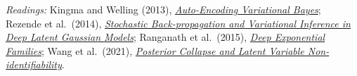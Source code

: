 \documentclass[12pt]{article}
\begin{document}
\vspace{0.05in}
{\footnotesize
\textit{Readings:} Kingma and Welling (2013), \href{https://arxiv.org/abs/1312.6114}{\emph{Auto-Encoding Variational Bayes}};
Rezende et al.\ (2014), \href{https://www.cs.columbia.edu/~blei/fogm/readings/RezendeMohamedWierstra2014.pdf}{\emph{Stochastic Back-propagation and Variational Inference in Deep Latent Gaussian Models}};
Ranganath et al.\ (2015), \href{https://arxiv.org/abs/1411.2581}{\emph{Deep Exponential Families}};
Wang et al.\ (2021), \href{https://www.cs.columbia.edu/~blei/papers/WangBleiCunningham2021.pdf}{\emph{Posterior Collapse and Latent Variable Non-identifiability}}.
\par}
\end{document}
